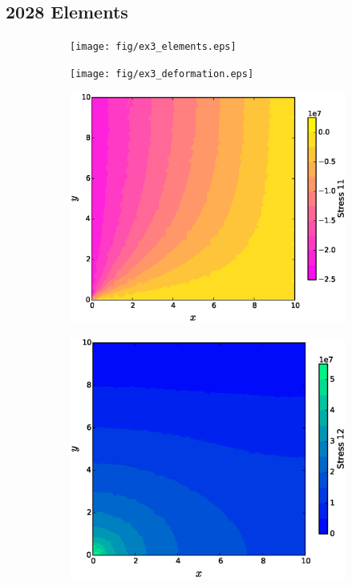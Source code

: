 \documentclass[11pt, a4paper]{article}
\numberwithin{equation}{section}
\begin{document}
\subsection{2028 Elements}


\begin{figure}[H]
\centering
	\begin{subfigure}[H]{0.49\textwidth}
		\texttt{[image: fig/ex3\_elements.eps]}
		\caption{}
		\label{fig:1}
	\end{subfigure}
	\begin{subfigure}[H]{0.49\textwidth}
		\texttt{[image: fig/ex3\_deformation.eps]}
		\caption{}
		\label{fig:2}
	\end{subfigure}	
	\begin{subfigure}[H]{0.49\textwidth}
		\includegraphics[width=\textwidth]{fig/ex3_stress_11.eps}
		\caption{}
		\label{fig:1}
	\end{subfigure}
		\begin{subfigure}[H]{0.49\textwidth}
		\includegraphics[width=\textwidth]{fig/ex3_stress_12.eps}

\end{subfigure}
\end{figure}
\end{document}
